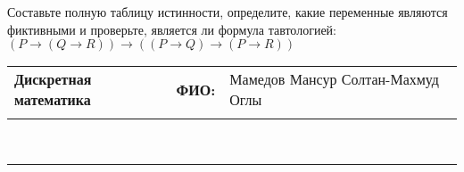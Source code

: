\documentclass[10pt]{exam}
\newcommand{\class}{Дискретная математика}
\newcommand{\examdate}{}
\begin{document}
\begin{questions}
\begin{enumerate} [a)]
\end{enumerate}\question Составьте полную таблицу истинности, определите, какие переменные являются фиктивными и проверьте, является ли формула тавтологией:
$(P \rightarrow (Q \rightarrow R)) \rightarrow ((P \rightarrow Q) \rightarrow (P \rightarrow R))$

\end{questions}
\newpage
\begin{flushright}
\begin{tabular}{p{2.8in} r l}
\textbf{\class} & \textbf{ФИО:} &Мамедов Мансур Солтан-Махмуд Оглы
\\

\textbf{\examdate} &&\\
\end{tabular}\\
\end{flushright}
\rule[1ex]{\textwidth}{.1pt}
\end{document}
